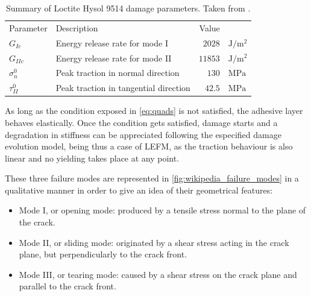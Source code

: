 \documentclass[cmfonts]{witpress}
\begin{document}
\begin{table}
	\centering
	\begin{tabular}{llrl}

		

		Parameter & Description & Value & \\

		

		$G_{Ic}$ & Energy release rate for mode I & $\num{2028}$ & $\si{\J/\m^2}$ \\
		$G_{IIc}$ & Energy release rate for mode II & $\num{11853}$ & $\si{\J/\m^2}$ \\
		$\sigma_{n}^{0}$ & Peak traction in normal direction & $\num{130}$ & $\si{\MPa}$ \\
		$\tau_{II}^{0}$ & Peak traction in tangential direction & $\num{42.5}$ & $\si{\MPa}$ \\

		

	\end{tabular}
	\caption[Summary of Loctite Hysol 9514 damage parameters.]{Summary of Loctite Hysol 9514 damage parameters. Taken from \cite{Scattina2011}.}
	\label{tab:ads_dmg_params}
\end{table}

As long as the condition exposed in \cref{eq:quads} is not satisfied, the adhesive layer behaves elastically. Once the condition gets satisfied, damage starts and a degradation in stiffness can be appreciated following the especified damage evolution model, being thus a case of LEFM, as the traction behaviour is also linear and no yielding takes place at any point.

These three failure modes are represented in \cref{fig:wikipedia_failure_modes} in a qualitative manner in order to give an idea of their geometrical features:
\begin{itemize}
	\item Mode I, or opening mode: produced by a tensile stress normal to the plane of the crack.

	\item Mode II, or sliding mode: originated by a shear stress acting in the crack plane, but perpendicularly to the crack front.

	\item Mode III, or tearing mode: caused by a shear stress on the crack plane and parallel to the crack front.
\end{itemize}
\end{document}
